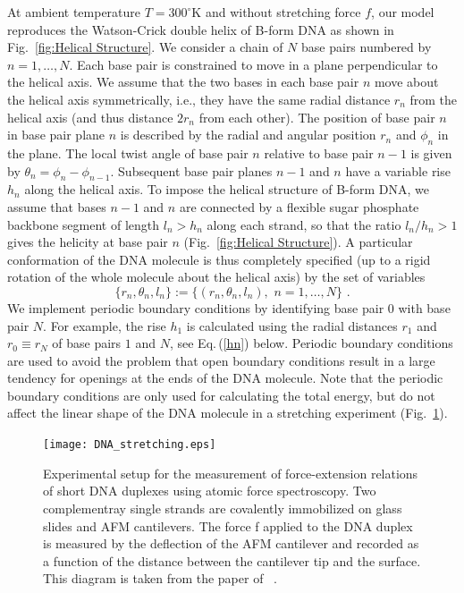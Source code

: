 \documentclass[12pt,masters,final]{UTRGVthesis}
\begin{document}
At ambient  temperature $T = 300^\circ$K and without stretching force $f$, our model reproduces the Watson-Crick double helix of B-form DNA as shown in Fig.~\ref{fig:Helical Structure}. We consider a chain of $N$ base pairs numbered by $n = 1,\ldots,N$.
Each base pair is constrained to move in a plane perpendicular to the helical axis. We assume that the two bases in each base pair $n$ move about the helical axis symmetrically, i.e., they have the same radial distance $r_n$ from the helical axis (and thus distance $2 r_n$ from each other).
The position of base pair $n$ in base pair plane $n$ is described by the radial and angular position $r_n$ and $\phi_n$ in the plane.
The local twist angle of base pair $n$ relative to base pair $n-1$ is given by
$\theta_n = \phi_n - \phi_{n-1}$. Subsequent base pair planes $n-1$ and $n$ have a variable rise $h_n$ along the helical axis. To impose the helical structure of B-form DNA, we assume that bases $n-1$ and $n$ are connected by a flexible sugar phosphate backbone segment of length $l_n > h_n$ along each strand, so that the ratio $l_n / h_n > 1$ gives the helicity at base pair $n$ (Fig.~\ref{fig:Helical Structure}).
A particular conformation of the DNA molecule is thus completely specified (up to a rigid rotation of the whole molecule about the helical axis) by the set of variables
%
\begin{equation} \label{variables}
  \{r_n, \theta_n, l_n\} := \{(r_n, \theta_n, l_n), \, \, n = 1,\ldots,N\} \, \, .
\end{equation}
%
We implement periodic boundary conditions by identifying base pair $0$ with base pair $N$.
For example, the rise $h_1$ is calculated using the radial distances
$r_1$ and $r_0 \equiv r_N$ of base pairs $1$ and $N$, see Eq.\,(\ref{hn}) below.
Periodic boundary conditions are used to avoid the problem that open boundary
conditions result in a large tendency for openings at the ends of the DNA molecule.
Note that the periodic boundary conditions are only used for calculating the total
energy, but do not affect the linear shape of the DNA molecule in a stretching experiment
(Fig.~\ref{fig:DNA stretching}).
%
\begin{figure}[!h]
  \texttt{[image: DNA\_stretching.eps]}
  \caption{\small Experimental setup for the measurement of force-extension relations of short DNA duplexes using atomic force spectroscopy. Two complementray single strands are covalently immobilized on glass slides and AFM cantilevers. The force f applied to the DNA duplex is measured by the deflection of the AFM cantilever and recorded as a function of the distance between the cantilever tip and the surface. This diagram is taken from the paper of ~\protect\cite{zhang2015determination}. }
  \label{fig:DNA stretching}
\end{figure}
\end{document}
